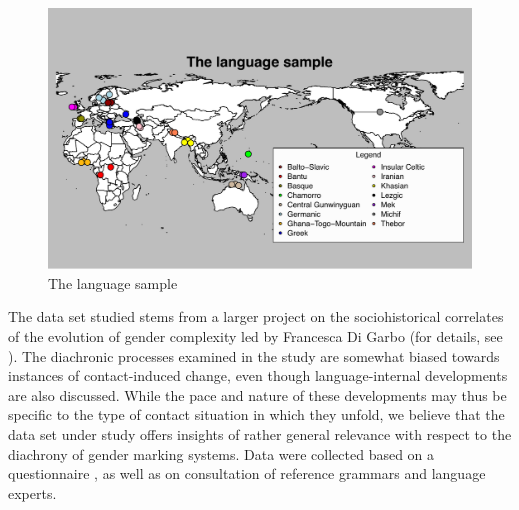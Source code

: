\documentclass[output=collectionpaper]{langsci/langscibook}
\begin{document}
\begin{figure}
\includegraphics[height=.4\textheight]{figures/11/VolumeSample1}
\caption{The language sample}
\label{fig:dgm:sample}
\end{figure}

The data set studied stems from a larger project on the sociohistorical correlates of the evolution of gender complexity led by Francesca Di Garbo (for details, see \citealt{DiGarboinpreparation}). The diachronic processes examined in the study are somewhat biased towards instances of contact-induced change, even though language-internal developments are also discussed. While the pace and nature of these developments may thus be specific to the type of contact situation in which they unfold, we believe that the data set under study offers insights of rather general relevance with respect to the diachrony of gender marking systems. Data were collected based on a questionnaire \citep{DiGarbo2015a}, as well as on consultation of reference grammars and language experts.
\end{document}
